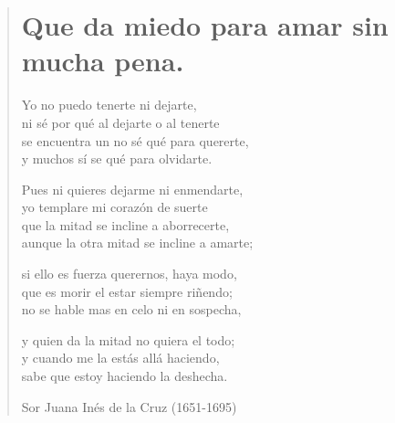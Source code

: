 \documentclass[12pt, twoside]{book}
\begin{document}
\newpage
\begin{verse}
\begin{center}
\section{Que da miedo para amar sin mucha pena.}
\end{center}
Yo no puedo tenerte ni dejarte,\\
ni sé por qué al dejarte o al tenerte\\
se encuentra un no sé qué para quererte,\\
y muchos sí se qué para olvidarte.
\newline

Pues ni quieres dejarme ni enmendarte,\\
yo templare mi corazón de suerte\\
que la mitad se incline a aborrecerte,\\
aunque la otra mitad se incline a amarte;
\newline

si ello es fuerza querernos, haya modo,\\
que es morir el estar siempre riñendo;\\
no se hable mas en celo ni en sospecha,
\newline

y quien da la mitad no quiera el todo;\\
y cuando me la estás allá haciendo,\\
sabe que estoy haciendo la deshecha.
\newline

Sor Juana Inés de la Cruz (1651-1695)
\end{verse}
\end{document}
